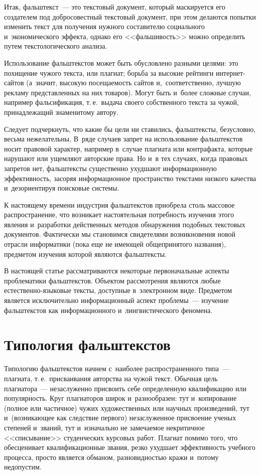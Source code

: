 \begin{multicols}{2}
   Итак, фальштекст~--- это текстовый документ, который маскируется его
создателем под добросовестный текстовый документ, при этом делаются
попытки изменить текст для получения нужного составителю социального
и~экономического эффекта, однако его <<фальшивость>> можно определить
путем текстологического анализа.

   Использование фальштекстов может быть об\-услов\-лено разными целями:
это похищение чужого текста, или плагиат; борьба за высокие рейтинги
   ин\-тер\-нет-сай\-тов (а~значит, высокую посещаемость сайтов
и,~соответственно, лучшую рекламу представленных на них товаров). Могут
быть и~более сложные случаи, например фальсификация, т.\,е.\ выдача
своего собственного текста за чужой, принадлежащий знаменитому автору.

   Следует подчеркнуть, что какие бы цели ни ставились, фальштексты,
безусловно, весьма нежелательны. В~ряде случаев запрет на использование
фальштекстов носит правовой характер, например в~случае плагиата или
контрафакта, которые нарушают или ущемляют авторские права. Но и~в тех
случаях, когда правовых запретов нет, фальштексты существенно ухудшают
информационную эффективность, засоряя информационное пространство
текстами низкого качества и~дезориентируя поисковые системы.

   К настоящему времени индустрия фальштекстов приобрела столь
массовое распространение, что возникает настоятельная потребность
изучения этого явления и~разработки действенных методов обнаружения
подобных текстовых документов. Фактически мы становимся свидетелями
возникновения новой отрасли информатики (пока еще не имеющей
общепринятого названия), предметом изучения которой являются
фальштексты.

   В настоящей статье рассматриваются некоторые первоначальные аспекты
проблематики фальштекстов. Объектом рассмотрения являются любые
естественно-языковые тексты, доступные в~электронном виде. Предметом
является исключительно информационный аспект проблемы~--- изучение
фальштекстов как информационного и~лингвистического феномена.

\section{Типология фальштекстов}

   Типологию фальштекстов начнем с~наиболее распространенного типа~---
плагиата, т.\,е.\ присваивания авторства на чужой текст. Обычная цель
плагиатора~--- незаслуженно присвоить себе определенную квалификацию
или популярность. Круг плагиаторов широк и~разнообразен: тут
и~копирование (полное или частичное) чужих художественных или научных
произведений, тут и~(возникающее как следствие первого) незаслуженное
присвоение ученых степеней и~званий, тут и~изначально не замечаемое
некритичное <<списывание>> студенческих курсовых работ. Плагиат
помимо того, что обесценивает квалификационные звания, резко ухудшает
эффективность учебного процесса, просто является обманом,
разновидностью кражи и~потому не\-до\-пус\-тим.


\end{multicols}
